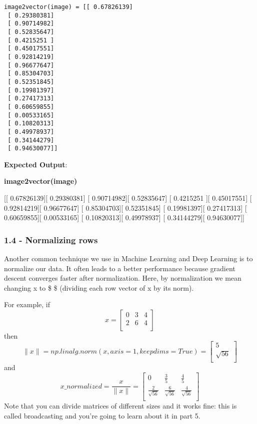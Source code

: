 \documentclass[11pt]{article}
\begin{document}
    \begin{Verbatim}[commandchars=\\\{\}]
image2vector(image) = [[ 0.67826139]
 [ 0.29380381]
 [ 0.90714982]
 [ 0.52835647]
 [ 0.4215251 ]
 [ 0.45017551]
 [ 0.92814219]
 [ 0.96677647]
 [ 0.85304703]
 [ 0.52351845]
 [ 0.19981397]
 [ 0.27417313]
 [ 0.60659855]
 [ 0.00533165]
 [ 0.10820313]
 [ 0.49978937]
 [ 0.34144279]
 [ 0.94630077]]

    \end{Verbatim}

    \textbf{Expected Output}:

\textbf{image2vector(image)}

{[}{[} 0.67826139{]}{[} 0.29380381{]} {[} 0.90714982{]}{[} 0.52835647{]}
{[} 0.4215251 {]}{[} 0.45017551{]} {[} 0.92814219{]}{[} 0.96677647{]}
{[} 0.85304703{]}{[} 0.52351845{]} {[} 0.19981397{]}{[} 0.27417313{]}
{[} 0.60659855{]}{[} 0.00533165{]} {[} 0.10820313{]}{[} 0.49978937{]}
{[} 0.34144279{]}{[} 0.94630077{]}{]}

    \subsubsection{1.4 - Normalizing rows}\label{normalizing-rows}

Another common technique we use in Machine Learning and Deep Learning is
to normalize our data. It often leads to a better performance because
gradient descent converges faster after normalization. Here, by
normalization we mean changing x to \$  \$ (dividing
each row vector of x by its norm).

For example, if \[x = 
\begin{bmatrix}
    0 & 3 & 4 \\
    2 & 6 & 4 \\
\end{bmatrix}\tag{3}\] then
\[\| x\| = np.linalg.norm(x, axis = 1, keepdims = True) = \begin{bmatrix}
    5 \\
    \sqrt{56} \\
\end{bmatrix}\tag{4} \]and
\[ x\_normalized = \frac{x}{\| x\|} = \begin{bmatrix}
    0 & \frac{3}{5} & \frac{4}{5} \\
    \frac{2}{\sqrt{56}} & \frac{6}{\sqrt{56}} & \frac{4}{\sqrt{56}} \\
\end{bmatrix}\tag{5}\] Note that you can divide matrices of different
sizes and it works fine: this is called broadcasting and you're going to
learn about it in part 5.
\end{document}
